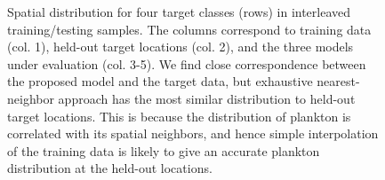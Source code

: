 \begin{figure}
{\begin{tabular}{c}
        \end{tabular}%
    }
    \caption{Spatial distribution for four target classes (rows) in interleaved training/testing samples. The columns correspond to training data (col. 1), held-out target locations (col. 2), and the three models under evaluation (col. 3-5). We find close correspondence between the proposed model and the target data, but exhaustive nearest-neighbor approach has the most similar distribution to held-out target locations. This is because the distribution of plankton is correlated with its spatial neighbors, and hence simple interpolation of the training data is likely to give an accurate plankton distribution at the held-out locations.}
    \label{fig:plankton-pisces-maps-8}
\end{figure}
